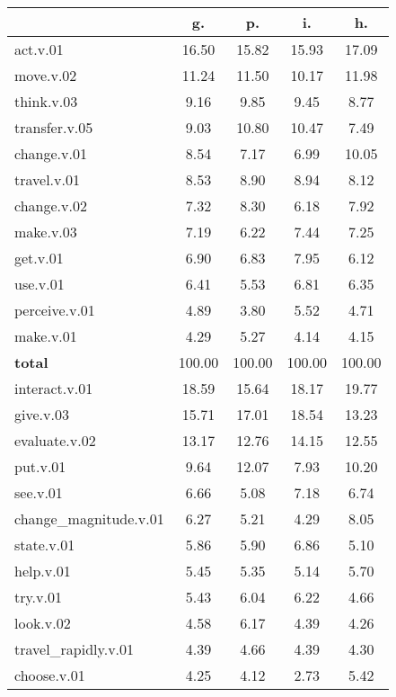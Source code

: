 \begin{table}[h!]
\begin{center}
\begin{tabular}{| l || c | c | c | c |}\hline
 & {\bf g.} & {\bf p.} & {\bf i.} & {\bf h.} \\\hline\hline
act.v.01 & 16.50  & 15.82  & 15.93  & 17.09 \\\hline
move.v.02 & 11.24  & 11.50  & 10.17  & 11.98 \\\hline
think.v.03 & 9.16  & 9.85  & 9.45  & 8.77 \\\hline
transfer.v.05 & 9.03  & 10.80  & 10.47  & 7.49 \\\hline
change.v.01 & 8.54  & 7.17  & 6.99  & 10.05 \\\hline
travel.v.01 & 8.53  & 8.90  & 8.94  & 8.12 \\\hline
change.v.02 & 7.32  & 8.30  & 6.18  & 7.92 \\\hline
make.v.03 & 7.19  & 6.22  & 7.44  & 7.25 \\\hline
get.v.01 & 6.90  & 6.83  & 7.95  & 6.12 \\\hline
use.v.01 & 6.41  & 5.53  & 6.81  & 6.35 \\\hline
perceive.v.01 & 4.89  & 3.80  & 5.52  & 4.71 \\\hline
make.v.01 & 4.29  & 5.27  & 4.14  & 4.15 \\\hline\hline
{{\bf total}} & 100.00  & 100.00  & 100.00  & 100.00 \\\hline\hline\hline
interact.v.01 & 18.59  & 15.64  & 18.17  & 19.77 \\\hline
give.v.03 & 15.71  & 17.01  & 18.54  & 13.23 \\\hline
evaluate.v.02 & 13.17  & 12.76  & 14.15  & 12.55 \\\hline
put.v.01 & 9.64  & 12.07  & 7.93  & 10.20 \\\hline
see.v.01 & 6.66  & 5.08  & 7.18  & 6.74 \\\hline
change\_magnitude.v.01 & 6.27  & 5.21  & 4.29  & 8.05 \\\hline
state.v.01 & 5.86  & 5.90  & 6.86  & 5.10 \\\hline
help.v.01 & 5.45  & 5.35  & 5.14  & 5.70 \\\hline
try.v.01 & 5.43  & 6.04  & 6.22  & 4.66 \\\hline
look.v.02 & 4.58  & 6.17  & 4.39  & 4.26 \\\hline
travel\_rapidly.v.01 & 4.39  & 4.66  & 4.39  & 4.30 \\\hline
choose.v.01 & 4.25  & 4.12  & 2.73  & 5.42 \\\hline\hline

\end{tabular}
\end{center}
\end{table}
